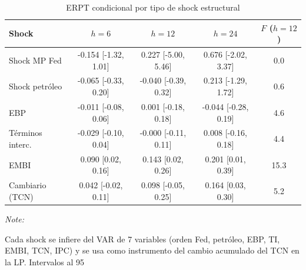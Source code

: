 \begin{table}[!h]
\centering
\caption{ERPT condicional por tipo de shock estructural}
\centering
\fontsize{9}{11}\selectfont
\begin{threeparttable}
\begin{tabular}[t]{lcccc}
\toprule
Shock & $h=6$ & $h=12$ & $h=24$ & $F$ ($h{=}12$)\\
\midrule
Shock MP Fed & -0.154 [-1.32, 1.01] & 0.227 [-5.00, 5.46] & 0.676 [-2.02, 3.37] & 0.0\\
Shock petróleo & -0.065 [-0.33, 0.20] & -0.040 [-0.39, 0.32] & 0.213 [-1.29, 1.72] & 0.6\\
EBP & -0.011 [-0.08, 0.06] & 0.001 [-0.18, 0.18] & -0.044 [-0.28, 0.19] & 4.6\\
Términos interc. & -0.029 [-0.10, 0.04] & -0.000 [-0.11, 0.11] & 0.008 [-0.16, 0.18] & 4.4\\
EMBI & 0.090 [0.02, 0.16] & 0.143 [0.02, 0.26] & 0.201 [0.01, 0.39] & 15.3\\
\addlinespace
Cambiario (TCN) & 0.042 [-0.02, 0.11] & 0.098 [-0.05, 0.25] & 0.164 [0.03, 0.30] & 5.2\\
\bottomrule
\end{tabular}
\begin{tablenotes}
\item \textit{Note: } 
\item Cada shock se infiere del VAR de 7 variables (orden Fed, petróleo, EBP, TI, EMBI, TCN, IPC) y se usa como instrumento del cambio acumulado del TCN en la LP. Intervalos al 95%
\end{tablenotes}
\end{threeparttable}
\end{table}